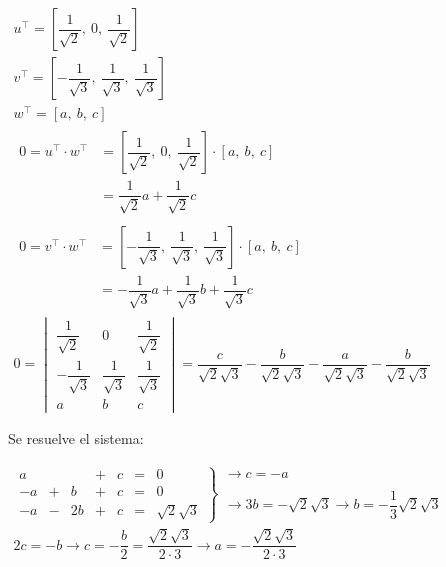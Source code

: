 \begin{enumerate}[label=\color{red}\textbf{\arabic*)}, leftmargin=*]
		$\begin{array}{l}
			u^\intercal=\left[\dfrac{1}{\sqrt{2}},\:0,\:\dfrac{1}{\sqrt{2}}\right]\\
			v^\intercal=\left[-\dfrac{1}{\sqrt{3}},\:\dfrac{1}{\sqrt{3}},\:\dfrac{1}{\sqrt{3}}\right]\\
			w^{\intercal}=[a,\:b,\:c]\\
			\begin{aligned}
				0=u^\intercal\cdot w^\intercal&=\left[\dfrac{1}{\sqrt{2}},\:0,\:\dfrac{1}{\sqrt{2}}\right]\cdot[a,\:b,\:c]\\
			&=\dfrac{1}{\sqrt{2}}a+\dfrac{1}{\sqrt{2}}c
			\end{aligned}\\
			\begin{aligned}
				0=v^\intercal\cdot w^\intercal&=\left[-\dfrac{1}{\sqrt{3}},\:\dfrac{1}{\sqrt{3}},\:\dfrac{1}{\sqrt{3}}\right]\cdot[a,\:b,\:c]\\
				&=-\dfrac{1}{\sqrt{3}}a+\dfrac{1}{\sqrt{3}}b+\dfrac{1}{\sqrt{3}}c
			\end{aligned}\\
			0=\begin{vmatrix}
			\dfrac{1}{\sqrt{2}} & 0 & \dfrac{1}{\sqrt{2}} \\ 
			-\dfrac{1}{\sqrt{3}} & \dfrac{1}{\sqrt{3}} & \dfrac{1}{\sqrt{3}} \\ 
			a & b & c
			\end{vmatrix} =\dfrac{c}{\sqrt{2}\sqrt{3}}-\dfrac{b}{\sqrt{2}\sqrt{3}}-\dfrac{a}{\sqrt{2}\sqrt{3}}-\dfrac{b}{\sqrt{2}\sqrt{3}}
		\end{array}$
		
		Se resuelve el sistema:
		
		$\begin{array}{l}
			\left.\begin{array}{rcrcrcr}
		a &  &  & + & c & = & 0 \\ 
		-a & + & b & + & c & = & 0 \\ 
		-a & - & 2b & + & c & = & \sqrt{2}\sqrt{3}
		\end{array} \right\rbrace\begin{array}{l}
		\longrightarrow
		 c=-a\\
		\\
		\longrightarrow 3b=-\sqrt{2}\sqrt{3}\longrightarrow b=-\dfrac{1}{3}\sqrt{2}\sqrt{3}
		\end{array}\\
		2c=-b\longrightarrow c=-\dfrac{b}{2}=\dfrac{\sqrt{2}\sqrt{3}}{2\cdot3}\longrightarrow a=-\dfrac{\sqrt{2}\sqrt{3}}{2\cdot3}
		\end{array}$
\end{enumerate}

